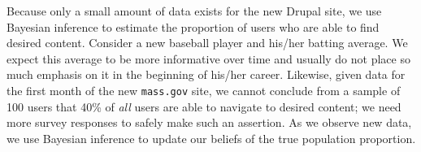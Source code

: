 Because only a small amount of data exists for the new Drupal site, we use Bayesian inference to estimate the proportion of users who are able to find desired content. Consider a new baseball player and his/her batting average. We expect this average to be more informative over time and usually do not place so much emphasis on it in the beginning of his/her career. Likewise, given data for the first month of the new \texttt{mass.gov} site, we cannot conclude from a sample of 100 users that 40\% of \textit{all} users are able to navigate to desired content; we need more survey responses to safely make such an assertion. As we observe new data, we use Bayesian inference to update our beliefs of the true population proportion.